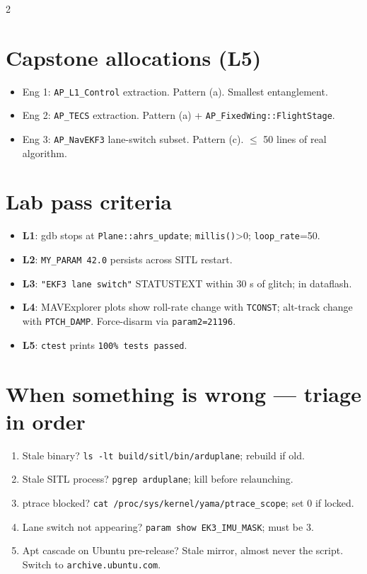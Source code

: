 \begin{multicols}{2}
\section*{Capstone allocations (L5)}
\begin{itemize}\footnotesize
  \item Eng 1: \texttt{AP\_L1\_Control} extraction. Pattern (a). Smallest entanglement.
  \item Eng 2: \texttt{AP\_TECS} extraction. Pattern (a) + \texttt{AP\_FixedWing::FlightStage}.
  \item Eng 3: \texttt{AP\_NavEKF3} lane-switch subset. Pattern (c). $\leq$ 50 lines of real algorithm.
\end{itemize}

\section*{Lab pass criteria}
\begin{itemize}\footnotesize
  \item \textbf{L1}: gdb stops at \texttt{Plane::ahrs\_update}; \texttt{millis()}>0; \texttt{loop\_rate}=50.
  \item \textbf{L2}: \texttt{MY\_PARAM 42.0} persists across SITL restart.
  \item \textbf{L3}: \texttt{"EKF3 lane switch"} STATUSTEXT within 30 s of glitch;  in dataflash.
  \item \textbf{L4}: MAVExplorer plots show roll-rate change with \texttt{TCONST}; alt-track change with \texttt{PTCH\_DAMP}. Force-disarm via \texttt{param2=21196}.
  \item \textbf{L5}: \texttt{ctest} prints \texttt{100\% tests passed}.
\end{itemize}

\section*{When something is wrong --- triage in order}
\begin{enumerate}\footnotesize
  \item Stale binary? \texttt{ls -lt build/sitl/bin/arduplane}; rebuild if old.
  \item Stale SITL process? \texttt{pgrep arduplane}; kill before relaunching.
  \item ptrace blocked? \texttt{cat /proc/sys/kernel/yama/ptrace\_scope}; set 0 if locked.
  \item Lane switch not appearing? \texttt{param show EK3\_IMU\_MASK}; must be 3.
  \item Apt cascade on Ubuntu pre-release? Stale mirror, almost never the script. Switch to \texttt{archive.ubuntu.com}.
\end{enumerate}


\end{multicols}

